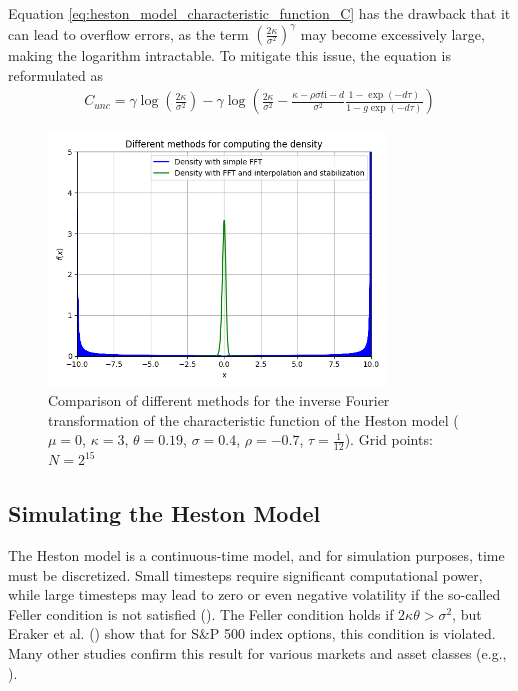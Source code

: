 Equation \eqref{eq:heston_model_characteristic_function_C} has the drawback that it can lead to overflow errors, as the term $\left(\frac{2\kappa}{\sigma^2}\right)^\gamma$ may become excessively large, making the logarithm intractable. To mitigate this issue, the equation is reformulated as
\begin{align}
    \label{eq:heston_model_characteristic_function_C_2}
    C_{unc} = \gamma \log\left(\frac{2\kappa}{\sigma^2}\right) - \gamma \log\left(\frac{2\kappa}{\sigma^2} - \frac{\kappa - \rho\sigma t \mathrm{i} - d}{\sigma^2} \frac{1 - \exp(-d \tau)}{1 - g \exp(-d \tau)}\right)
\end{align}

\begin{figure}[h]
    \centering
    \includegraphics[width=0.8\textwidth]{img/different_ifft_methods.png}
    \caption{Comparison of different methods for the inverse Fourier transformation of the characteristic function of the Heston model ($\mu=0$, $\kappa=3$, $\theta=0.19$, $\sigma=0.4$, $\rho=-0.7$, $\tau=\frac{1}{12}$). Grid points: $N=2^{15}$}
    \label{fig:ifft_comparison}
\end{figure}

\subsection{Simulating the Heston Model}

The Heston model is a continuous-time model, and for simulation purposes, time must be discretized. Small timesteps require significant computational power, while large timesteps may lead to zero or even negative volatility if the so-called Feller condition is not satisfied (\cite{albrecherLittleHestonTrap2007}). The Feller condition holds if $2\kappa\theta > \sigma^2$, but Eraker et al. (\citeyear{erakerImpactJumpsVolatility2003}) show that for S\&P 500 index options, this condition is violated. Many other studies confirm this result for various markets and asset classes (e.g., \cite{changOptionPricingDouble2021,huPricingVolatilityJump2022}).

